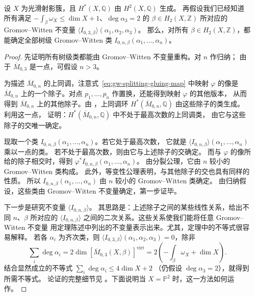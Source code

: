 \begin{theorem}\label{thm:gw-reconstruction}
设 $X$ 为光滑射影簇，且 $H^*(X,\mathbb Q)$ 由 $H^2(X,\mathbb Q)$ 生成。
再假设我们已经知道所有满足 $-\int_\beta\omega_X\leq\dim X+1$、$\deg\alpha_3=2$ 的
$\beta\in H_2(X,\mathbb Z)$ 所对应的 Gromov--Witten 不变量
$\langle I_{0,3,\beta}\rangle(\alpha_1,\alpha_2,\alpha_3)$。
那么，对所有 $\beta\in H_2(X,\mathbb Z)$，都能确定全部树级 Gromov--Witten 类
$I_{0,n,\beta}(\alpha_1,\ldots,\alpha_n)$。
\end{theorem}
\begin{proof}
先证明所有树级类都能由 Gromov--Witten 不变量重构。对 $n$ 作归纳；
由于 $\overline M_{0,3}$ 是一点，可假设 $n>3$。

为描述 $\overline M_{0,n}$ 的上同调，注意式~\eqref{eq:gw-splitting-gluing-map} 中映射 $\varphi$ 的像是
$\overline M_{0,n}$ 上的一个除子。对点 $p_1,\ldots,p_n$ 作置换，还能得到映射 $\varphi$ 的其他版本，
从而得到 $\overline M_{0,n}$ 上的其他除子。由 ，上同调环
$H^*(\overline M_{0,n},\mathbb Q)$ 由这些除子的类生成。
利用这一点， 证明：$H^*(\overline M_{0,n},\mathbb Q)$ 中不处于最高次数的上同调类，
由它与这些除子的交唯一确定。

现取一个类 $I_{0,n,\beta}(\alpha_1,\ldots,\alpha_n)$。若它处于最高次数，
它就是 $\langle I_{0,n,\beta}\rangle(\alpha_1,\ldots,\alpha_n)$ 乘以一点的类。
若不处于最高次数，则由它与上述除子的交确定。
而与 $\varphi$ 的像所给的除子相交时，得到 $\varphi^*I_{0,n,\beta}(\alpha_1,\ldots,\alpha_n)$。
由分裂公理，它由 $n$ 较小的 Gromov--Witten 类构成。
此外，等变性公理表明，与其他除子的交也具有同样的性质。
所以 $I_{0,n,\beta}(\alpha_1,\ldots,\alpha_n)$ 由 $n$ 较小的 Gromov--Witten 类确定。
由归纳假设，这些类由 Gromov--Witten 不变量确定，第一步证毕。

下一步是研究不变量 $\langle I_{0,n,\beta}\rangle$。
其思路是：上述除子之间的某些线性关系，给出不同 $n$、$\beta$ 所对应的
$\langle I_{0,n,\beta}\rangle$ 之间的二次关系。这些关系使我们能将任意 Gromov--Witten 不变量
用定理陈述中列出的不变量表示出来。尤其，定理中的不等式很容易解释。
若各 $\alpha_i$ 为齐次类，则 $\langle I_{0,3,\beta}\rangle(\alpha_1,\alpha_2,\alpha_3)=0$，除非
\[
\sum_i\deg\alpha_i=2\dim[\overline M_{0,3}(X,\beta)]^{\mathrm{virt}}
=2\left(-\int_\beta\omega_X+\dim X\right).
\]
结合显然成立的不等式 $\sum_i\deg\alpha_i\leq4\dim X+2$
（仍假设 $\deg\alpha_3=2$），就得到所需不等式。
论证的完整细节见 。下面说明当 $X=\mathbb P^2$ 时，这一方法如何运作。
\end{proof}

